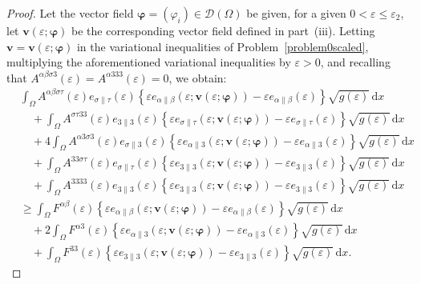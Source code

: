 \documentclass{amsart}
\def\dd{\, \mathrm{d}}
\begin{document}
\begin{proof}
Let the vector field $\bm{\varphi}=(\varphi_i) \in \bm{\mathcal{D}}(\Omega)$ be given, for a given $0<\varepsilon\le \varepsilon_2$, let $\bm{v}(\varepsilon;\bm{\varphi})$ be the corresponding vector field defined in part~(iii). Letting $\bm{v}=\bm{v}(\varepsilon;\bm{\varphi})$ in the variational inequalities of Problem~\ref{problem0scaled}, multiplying the aforementioned variational inequalities by $\varepsilon>0$, and recalling that $A^{\alpha\beta\sigma3}(\varepsilon)=A^{\alpha333}(\varepsilon)=0$, we obtain:
\begin{equation}
	\label{varineq1}
	\begin{aligned}
		&\int_{\Omega}A^{\alpha\beta\sigma\tau}(\varepsilon) e_{\sigma\|\tau}(\varepsilon) \left\{\varepsilon e_{\alpha\|\beta}(\varepsilon;\bm{v}(\varepsilon;\bm{\varphi}))-\varepsilon e_{\alpha\|\beta}(\varepsilon)\right\} \sqrt{g(\varepsilon)} \dd x\\
		&\quad+\int_{\Omega} A^{\sigma\tau33}(\varepsilon) e_{3\|3}(\varepsilon)\left\{\varepsilon e_{\sigma\|\tau}(\varepsilon;\bm{v}(\varepsilon;\bm{\varphi})) -\varepsilon e_{\sigma\|\tau}(\varepsilon)\right\} \sqrt{g(\varepsilon)} \dd x\\
		&\quad+4\int_{\Omega}A^{\alpha3\sigma3}(\varepsilon) e_{\sigma\|3}(\varepsilon)\left\{\varepsilon e_{\alpha\|3}(\varepsilon;\bm{v}(\varepsilon;\bm{\varphi}))-\varepsilon e_{\alpha\|3}(\varepsilon)\right\} \sqrt{g(\varepsilon)} \dd x\\
		&\quad+\int_{\Omega}A^{33\sigma\tau}(\varepsilon) e_{\sigma\|\tau}(\varepsilon) \left\{\varepsilon e_{3\|3}(\varepsilon;\bm{v}(\varepsilon;\bm{\varphi})) -\varepsilon e_{3\|3}(\varepsilon)\right\} \sqrt{g(\varepsilon)} \dd x\\
		&\quad+\int_{\Omega}A^{3333}(\varepsilon) e_{3\|3}(\varepsilon) \left\{\varepsilon e_{3\|3}(\varepsilon;\bm{v}(\varepsilon;\bm{\varphi}))-\varepsilon e_{3\|3}(\varepsilon)\right\} \sqrt{g(\varepsilon)} \dd x\\
		&\ge \int_{\Omega} F^{\alpha\beta}(\varepsilon) \left\{\varepsilon e_{\alpha\|\beta}(\varepsilon;\bm{v}(\varepsilon;\bm{\varphi}))-\varepsilon e_{\alpha\|\beta}(\varepsilon)\right\} \sqrt{g(\varepsilon)} \dd x\\
		&\quad+2\int_{\Omega} F^{\alpha3}(\varepsilon)\left\{\varepsilon e_{\alpha\|3}(\varepsilon;\bm{v}(\varepsilon;\bm{\varphi}))-\varepsilon e_{\alpha\|3}(\varepsilon)\right\} \sqrt{g(\varepsilon)} \dd x\\
		&\quad+\int_{\Omega} F^{33}(\varepsilon) \left\{\varepsilon e_{3\|3}(\varepsilon;\bm{v}(\varepsilon;\bm{\varphi}))-\varepsilon e_{3\|3}(\varepsilon)\right\} \sqrt{g(\varepsilon)} \dd x.
	\end{aligned}
\end{equation}


\end{proof}
\end{document}
